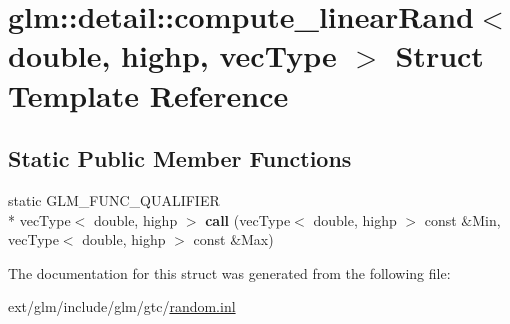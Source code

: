 \hypertarget{structglm_1_1detail_1_1compute__linear_rand_3_01double_00_01highp_00_01vec_type_01_4}{\section{glm\-:\-:detail\-:\-:compute\-\_\-linear\-Rand$<$ double, highp, vec\-Type $>$ Struct Template Reference}
\label{structglm_1_1detail_1_1compute__linear_rand_3_01double_00_01highp_00_01vec_type_01_4}
}
\subsection*{Static Public Member Functions}
\begin{DoxyCompactItemize}
\item 
\hypertarget{structglm_1_1detail_1_1compute__linear_rand_3_01double_00_01highp_00_01vec_type_01_4_a2b6945aa0c510d768365896126a5017a}{static G\-L\-M\-\_\-\-F\-U\-N\-C\-\_\-\-Q\-U\-A\-L\-I\-F\-I\-E\-R \\*
vec\-Type$<$ double, highp $>$ {\bfseries call} (vec\-Type$<$ double, highp $>$ const \&Min, vec\-Type$<$ double, highp $>$ const \&Max)}\label{structglm_1_1detail_1_1compute__linear_rand_3_01double_00_01highp_00_01vec_type_01_4_a2b6945aa0c510d768365896126a5017a}

\end{DoxyCompactItemize}


The documentation for this struct was generated from the following file\-:\begin{DoxyCompactItemize}
\item 
ext/glm/include/glm/gtc/\hyperlink{random_8inl}{random.\-inl}\end{DoxyCompactItemize}
